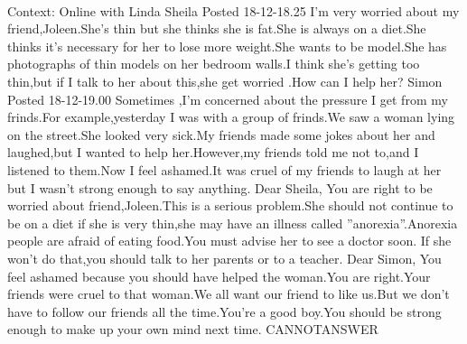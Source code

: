 \documentclass[11pt,a4paper, onecolumn]{article}
\begin{document}
\\ Context: Online with Linda Sheila Posted 18-12-18.25 I'm very worried about my friend,Joleen.She's thin but she thinks she is fat.She is always on a diet.She thinks it's necessary for her to lose more weight.She wants to be model.She has photographs of thin models on her bedroom walls.I think she's getting too thin,but if I talk to her about this,she get worried .How can I help her? Simon Posted 18-12-19.00 Sometimes ,I'm concerned about the pressure I get from my frinds.For example,yesterday I was with a group of frinds.We saw a woman lying on the street.She looked very sick.My friends made some jokes about her and laughed,but I wanted to help her.However,my friends told me not to,and I listened to them.Now I feel ashamed.It was cruel of my friends to laugh at her but I wasn't strong enough to say anything. Dear Sheila, You are right to be worried about friend,Joleen.This is a serious problem.She should not continue to be on a diet if she is very thin,she may have an illness called ''anorexia''.Anorexia people are afraid of eating food.You must advise her to see a doctor soon. If she won't do that,you should talk to her parents or to a teacher. Dear Simon, You feel ashamed because you should have helped the woman.You are right.Your friends were cruel to that woman.We all want our friend to like us.But we don't have to follow our friends all the time.You're a good boy.You should be strong enough to make up your own mind next time. CANNOTANSWER
\end{document}

